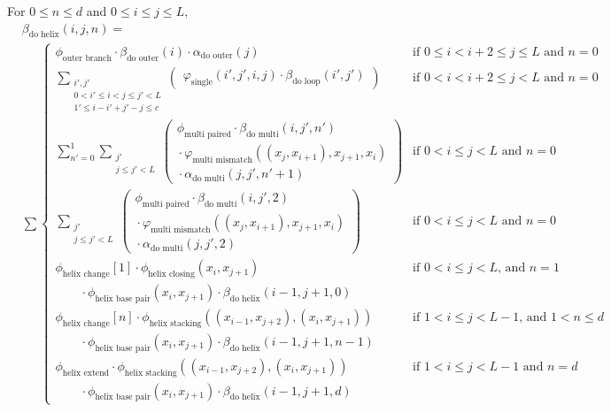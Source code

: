 \documentclass{article}
\newcommand{\Adoouter}{\alpha_\text{do outer}}
\newcommand{\Bdoouter}{\beta_\text{do outer}}
\newcommand{\outerbranch}{\phi_\text{outer branch}}
\newcommand{\multimismatch}{\varphi_\text{multi mismatch}}
\newcommand{\helixstacking}{\phi_\text{helix stacking}}
\newcommand{\helixbasepair}{\phi_\text{helix base pair}}
\newcommand{\helixextend}{\phi_\text{helix extend}}
\newcommand{\helixclosing}{\phi_\text{helix closing}}
\newcommand{\helixchange}{\phi_\text{helix change}}
\newcommand{\Bdoloop}{\beta_\text{do loop}}
\newcommand{\single}{\varphi_\text{single}}
\newcommand{\Adomulti}{\alpha_\text{do multi}}
\newcommand{\Bdomulti}{\beta_\text{do multi}}
\newcommand{\multipaired}{\phi_\text{multi paired}}
\newcommand{\Bdohelix}{\beta_\text{do helix}}
\begin{document}
  \noindent
  For $0 \le n \le d$ and $0 \le i \le j \le L$,
  \begin{align*}
    &\Bdohelix(i,j,n) = \\
    &\sum \begin{cases}
      \outerbranch \cdot \Bdoouter(i) \cdot \Adoouter(j) & \text{if $0 \le i < i+2 \le j \le L$ and $n=0$} \\
      \displaystyle \sum_{\substack{i', j' \\ 0 < i' \le i < j \le j' < L\\ 1' \le i-i' + j'-j \le c}}
      \left(
      \begin{matrix}
	\single(i',j',i,j) \cdot \Bdoloop(i',j')
      \end{matrix}
      \right) & \text{if $0 < i < i+2 \le j < L$ and $n = 0$} \\
      \displaystyle \sum_{n'=0}^1 \sum_{\substack{j' \\ j \le j' < L}} 
      \left(
      \begin{matrix}
	\multipaired \cdot \Bdomulti(i,j',n') \\
        {} \cdot \multimismatch((x_j,x_{i+1}),x_{j+1},x_i) \\
	{} \cdot \Adomulti(j,j',n'+1)
      \end{matrix} 
      \right) & \text{if $0 < i \le j < L$ and $n = 0$} \\
      \displaystyle \sum_{\substack{j' \\ j \le j' < L}} 
      \left(
      \begin{matrix}
	\multipaired \cdot \Bdomulti(i,j',2) \\
        {} \cdot \multimismatch((x_j,x_{i+1}),x_{j+1},x_i) \\
	{} \cdot \Adomulti(j,j',2)
      \end{matrix} 
      \right) & \text{if $0 < i \le j < L$ and $n = 0$} \\
      \helixchange[1] \cdot \helixclosing (x_i, x_{j+1}) & \text{if $0 < i \le j < L$, and $n=1$} \\
      \qquad{} \cdot \helixbasepair (x_i, x_{j+1}) \cdot \Bdohelix(i-1,j+1,0) \\
      \helixchange[n] \cdot \helixstacking((x_{i-1},x_{j+2}),(x_{i},x_{j+1})) & \text{if $1 < i \le j < L-1$, and $1 < n \le d$} \\
      \qquad{} \cdot \helixbasepair (x_i, x_{j+1}) \cdot \Bdohelix(i-1,j+1,n-1) \\
      \helixextend \cdot \helixstacking((x_{i-1},x_{j+2}),(x_i,x_{j+1})) & \text{if $1 < i \le j < L-1$ and $n=d$} \\
      \qquad{} \cdot \helixbasepair (x_i, x_{j+1}) \cdot \Bdohelix(i-1,j+1,d) 
    \end{cases}
  \end{align*} 
\end{document}
